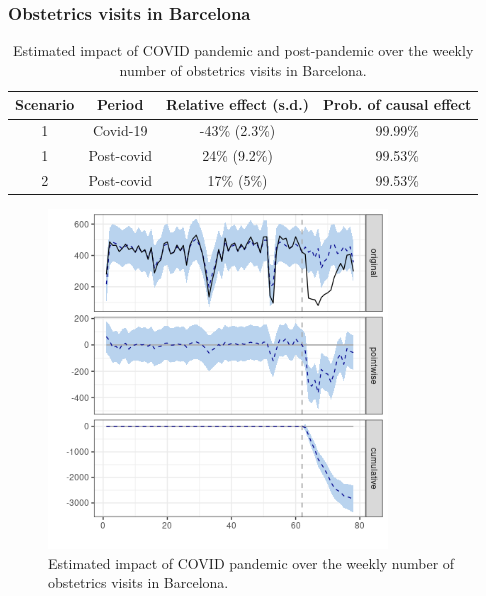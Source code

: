 \documentclass[9pt]{osa-supplemental-document}
\begin{document}
\subsubsection{Obstetrics visits in Barcelona}\label{bcn}
\begin{table}[H]\caption{Estimated impact of COVID pandemic and post-pandemic over the weekly number of obstetrics visits in Barcelona.}
  \centering  
  \begin{tabular}{ |c|c|c|c| }
      \hline
   \textbf{Scenario} & \textbf{Period} & \textbf{Relative effect (s.d.)} & \textbf{Prob. of causal effect} \\ 
   \hline
   1 & Covid-19 & -43\% (2.3\%) & 99.99\% \\  
   1 & Post-covid & 24\% (9.2\%) & 99.53\% \\
   \hline   
   2 & Post-covid & 17\% (5\%) & 99.53\% \\
   \hline
  \end{tabular}
\end{table}

\begin{center}
  \begin{figure}[H]
    \includegraphics[width=9cm]{obstetrics_covid_Barcelona.png}\caption{Estimated impact of COVID pandemic over the weekly number of obstetrics visits in Barcelona.}
  \end{figure}
  \end{center}
  
\end{document}

